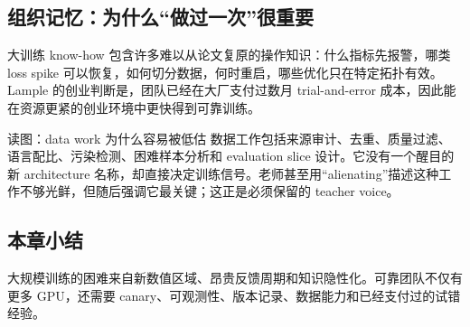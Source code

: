 \subsection{组织记忆：为什么“做过一次”很重要}

大训练 know-how 包含许多难以从论文复原的操作知识：什么指标先报警，哪类 loss spike 可以恢复，如何切分数据，何时重启，哪些优化只在特定拓扑有效。Lample 的创业判断是，团队已经在大厂支付过数月 trial-and-error 成本，因此能在资源更紧的创业环境中更快得到可靠训练。


\begin{knowledgebox}{读图：data work 为什么容易被低估}
数据工作包括来源审计、去重、质量过滤、语言配比、污染检测、困难样本分析和 evaluation slice 设计。它没有一个醒目的新 architecture 名称，却直接决定训练信号。老师甚至用“alienating”描述这种工作不够光鲜，但随后强调它最关键；这正是必须保留的 teacher voice。
\end{knowledgebox}


\subsection{本章小结}

大规模训练的困难来自新数值区域、昂贵反馈周期和知识隐性化。可靠团队不仅有更多 GPU，还需要 canary、可观测性、版本记录、数据能力和已经支付过的试错经验。

